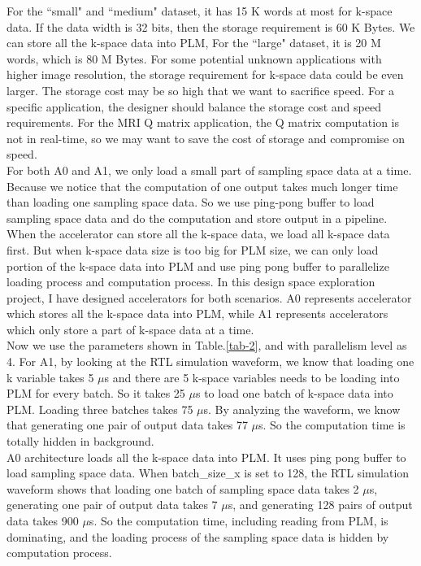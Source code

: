 \documentclass{sig-alternate}
\begin{document}
For the ``small" and ``medium" dataset, it has 15 K words at most for k-space data. If the data width is 32 bits, then the storage requirement is 60 K Bytes. We can store all the k-space data into PLM, For the ``large" dataset, it is 20 M words, which is 80 M Bytes. For some potential unknown applications with higher image resolution, the storage requirement for k-space data could be even larger. The storage cost may be so high that we want to sacrifice speed. For a specific application, the designer should balance the storage cost and speed requirements. For the MRI Q matrix application, the Q matrix computation is not in real-time, so we may want to save the cost of storage and compromise on speed.\\

For both A0 and A1, we only load a small part of sampling space data at a time. Because we notice that the computation of one output takes much longer time than loading one sampling space data. So we use ping-pong buffer to load sampling space data and do the computation and store output in a pipeline. When the accelerator can store all the k-space data, we load all k-space data first. But when k-space data size is too big for PLM size, we can only load portion of the k-space data into PLM and use ping pong buffer to parallelize loading process and computation process. In this design space exploration project, I have designed accelerators for both scenarios. A0 represents accelerator which stores all the k-space data into PLM, while A1 represents accelerators which only store a part of k-space data at a time. \\

Now we use the parameters shown in Table.\ref{tab-2}, and with parallelism level as 4. For A1, by looking at the RTL simulation waveform, we know that loading one k variable takes 5 $\mu$s and there are 5 k-space variables needs to be loading into PLM for every batch. So it takes 25 $\mu$s to load one batch of k-space data into PLM. Loading three batches takes 75 $\mu$s. By analyzing the waveform, we know that generating one pair of output data takes 77 $\mu$s. So the computation time is totally hidden in background. \\

A0 architecture loads all the k-space data into PLM. It uses ping pong buffer to load sampling space data. When batch\_size\_x is set to 128, the RTL simulation waveform shows that loading one batch of sampling space data takes 2 $\mu$s, generating one pair of output data takes 7 $\mu$s, and generating 128 pairs of output data takes 900 $\mu$s. So the computation time, including reading from PLM, is dominating, and the loading process of the sampling space data is hidden by computation process. \\
\end{document}
